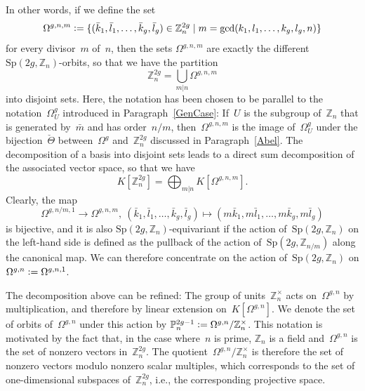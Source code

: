 \documentclass[12pt]{article}
\theoremstyle{definition}
\theoremstyle{break}
\newcommand{\Z}{\mathbb{Z}}
\newcommand{\Sp}{\mathrm{Sp}}
\renewcommand{\P}{\mathbb{P}}
\renewcommand{\1}{\mathbbm{1}}
\renewcommand{\P}{\mathbb{P}}
\newcommand{\deq}{\vcentcolon =}
\begin{document}
In other words, if we define  the set
\[\Omega^{g,n,m} \deq
\{(\bar{k}_1, \bar{l}_1,\ldots, \bar{k}_g, \bar{l}_g) \in \Z_n^{2g}
\mid m = \gcd(k_1, l_1,\ldots, k_g, l_g,n) \}\]
for every divisor~$m$ of~$n$, then the sets $\Omega^{g,n,m}$ are exactly the different
$\Sp(2g, \Z_n)$-orbits, so that we have the partition
\[\Z_n^{2g} = \bigcup_{m|n} \Omega^{g,n,m}\]
into disjoint sets. Here, the notation has been chosen to be parallel to the
notation~$\Omega_U^{g}$ introduced in Paragraph~\ref{GenCase}: If~$U$ is the subgroup of~$\Z_n$ that is generated by~$\bar{m}$ and has order~$n/m$, then~$\Omega^{g,n,m}$ is the image of~$\Omega_U^{g}$ under the bijection~$\check{\Theta}$ between~$\Omega^{g}$ and~$\Z_n^{2g}$ discussed in Paragraph~\ref{Abel}. The decomposition of a basis into disjoint sets leads to a direct sum decomposition of the associated vector space, so that we have
\[K[\Z_n^{2g}] = \bigoplus_{m|n} K[\Omega^{g,n,m}].\]
Clearly, the map
\[\Omega^{g,n/m,1} \to \Omega^{g,n,m},~(\bar{k}_1, \bar{l}_1,\ldots, \bar{k}_g, \bar{l}_g)
\mapsto (m\bar{k}_1, m\bar{l}_1,\ldots, m\bar{k}_g, m\bar{l}_g)\]
is bijective, and it is also $\Sp(2g, \Z_n)$-equivariant if the action of~$\Sp(2g, \Z_n)$ on the left-hand side is defined as the pullback of the action of~$\Sp(2g, \Z_{n/m})$ along the canonical map. We can therefore concentrate on the action of~$\Sp(2g, \Z_n)$ on
$\Omega^{g,n} \deq \Omega^{g,n,1}$.

The decomposition above can be refined: The group of units~$\Z_n^\times$ acts on~$\Omega^{g,n}$ by multiplication, and therefore by linear extension on~$K[\Omega^{g,n}]$. We denote the set of orbits of~$\Omega^{g,n}$ under this action by $\P^{2g-1}_n \deq \Omega^{g,n}/\Z_n^\times$. This notation is motivated by the fact that, in the case where~$n$ is prime, $\Z_n$ is a field
and~$\Omega^{g,n}$ is the set of nonzero vectors in~$\Z_n^{2g}$. The
quotient~$\Omega^{g,n}/\Z_n^\times$ is therefore the set of nonzero vectors modulo nonzero scalar multiples, which corresponds to the set of one-dimensional subspaces of~$\Z_n^{2g}$, i.e., the corresponding projective space.
\end{document}
